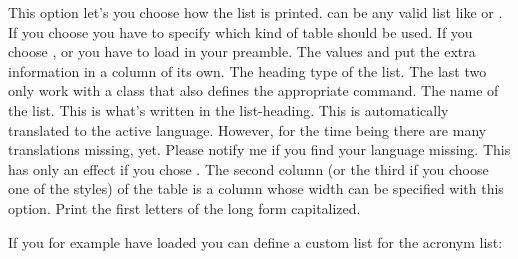 \documentclass[DIV10,toc=index,toc=bib,hyperfootnotes=false]{cnpkgdoc}
\begin{document}
\begin{beschreibung}
   This option let's you choose how the list is printed.  can be any
   valid list like
  or .
   If you choose  you have to specify which kind of table
   should be used. If you choose ,  or
    you have to load  in your preamble.
   The values  and  put the extra
   information in a column of its own.
   The heading type of the list. The last two only work with
   a \KOMAScript{} class that also defines the appropriate command.
   The name of the list. This is what's written in the list-heading. This is
   automatically translated to the active language. However, for the time being
   there are many translations missing, yet. Please notify me if you find your
   language missing.
   This has only an effect if you chose . The second column
   (or the third if you choose one of the  styles) of the table is a
    column whose width can be specified with this option.
   Print the first letters of the long form capitalized.
\end{beschreibung}

If you for example have loaded  you can define a custom list for
the acronym list:
\begin{beispiel}
 \newcommand*\addcolon[1]{#1:}
 \printacronyms
\end{beispiel}
\newcommand*\addcolon[1]{#1:}
\printacronyms
\end{document}
